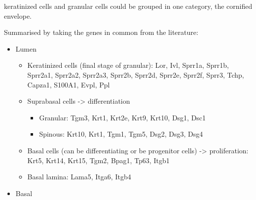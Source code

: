 \documentclass[
  letterpaper,
  DIV=11,
  numbers=noendperiod]{scrreprt}
\providecommand{\tightlist}{%
  \setlength{\itemsep}{0pt}\setlength{\parskip}{0pt}}\usepackage{longtable,booktabs,array}
\begin{document}
\begin{tcolorbox}[enhanced jigsaw, coltitle=black, breakable, opacityback=0, colframe=quarto-callout-tip-color-frame, colback=white, opacitybacktitle=0.6, bottomrule=.15mm, titlerule=0mm, rightrule=.15mm, leftrule=.75mm, toprule=.15mm, colbacktitle=quarto-callout-tip-color!10!white, bottomtitle=1mm, left=2mm, toptitle=1mm, title=\textcolor{quarto-callout-tip-color}{\faLightbulb}\hspace{0.5em}{Tip}, arc=.35mm]

keratinized cells and granular cells could be grouped in one category,
the cornified envelope.

\end{tcolorbox}

Summarised by taking the genes in common from the literature:

\begin{itemize}
\tightlist
\item
  Lumen

  \begin{itemize}
  \tightlist
  \item
    Keratinized cells (final stage of granular): Lor, Ivl, Sprr1a,
    Sprr1b, Sprr2a1, Sprr2a2, Sprr2a3, Sprr2b, Sprr2d, Sprr2e, Sprr2f,
    Sprr3, Tchp, Capza1, S100A1, Evpl, Ppl
  \item
    Suprabasal cells -\textgreater{} differentiation

    \begin{itemize}
    \tightlist
    \item
      Granular: Tgm3, Krt1, Krt2e, Krt9, Krt10, Dsg1, Dsc1
    \item
      Spinous: Krt10, Krt1, Tgm1, Tgm5, Dsg2, Dsg3, Dsg4
    \end{itemize}
  \item
    Basal cells (can be differentiating or be progenitor cells)
    -\textgreater{} proliferation: Krt5, Krt14, Krt15, Tgm2, Bpag1,
    Tp63, Itgb1
  \item
    Basal lamina: Lama5, Itga6, Itgb4
  \end{itemize}
\item
  Basal
\end{itemize}
\end{document}
